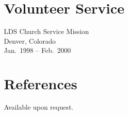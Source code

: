\begin{resume}
\section{\secft Volunteer Service}
LDS Church Service Mission\\
Denver, Colorado\\
Jan.\ 1998 -- Feb.\ 2000



\section{\secft References} Available upon request.

\end{resume}


